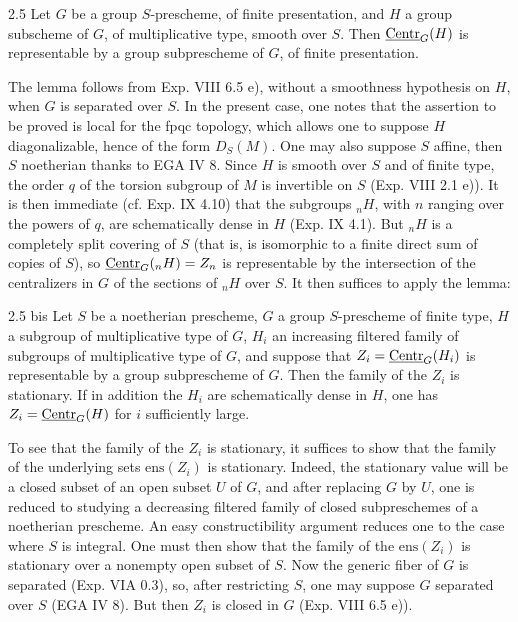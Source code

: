 \begin{lemma}{2.5}\label{XV.2.5}
Let $G$ be a group $S$-prescheme, of finite presentation, and $H$ a group subscheme of $G$, of multiplicative type, smooth over $S$. Then $\underline{\mathrm{Centr}}_G(H)$ is representable by a group subprescheme of $G$, of finite presentation.
\end{lemma}
The lemma follows from Exp. VIII 6.5 e), without a smoothness hypothesis on $H$, when $G$ is separated over $S$. In the present case, one notes that the assertion to be proved is local for the fpqc topology, which allows one to suppose $H$ diagonalizable, hence of the form $D_S(M)$. One may also suppose $S$ affine, then $S$ noetherian thanks to EGA IV 8. Since $H$ is smooth over $S$ and of finite type, the order $q$ of the torsion subgroup of $M$ is invertible on $S$ (Exp. VIII 2.1 e)). It is then immediate (cf. Exp. IX 4.10) that the subgroups ${}_nH$, with $n$ ranging over the powers of $q$, are schematically dense in $H$ (Exp. IX 4.1). But ${}_nH$ is a completely split covering of $S$ (that is, is isomorphic to a finite direct sum of copies of $S$), so $\underline{\mathrm{Centr}}_G({}_nH)=Z_n$ is representable by the intersection of the centralizers in $G$ of the sections of ${}_nH$ over $S$. It then suffices to apply the lemma:

\begin{lemma}{2.5 bis}\label{XV.2.5bis}
Let $S$ be a noetherian prescheme, $G$ a group $S$-prescheme of finite type, $H$ a subgroup of multiplicative type of $G$, $H_i$ an increasing filtered family of subgroups of multiplicative type of $G$, and suppose that $Z_i=\underline{\mathrm{Centr}}_G(H_i)$ is representable by a group subprescheme of $G$. Then the family of the $Z_i$ is stationary. If in addition the $H_i$ are schematically dense in $H$, one has $Z_i=\underline{\mathrm{Centr}}_G(H)$ for $i$ sufficiently large.
\end{lemma}
To see that the family of the $Z_i$ is stationary, it suffices to show that the family of the underlying sets $\mathrm{ens}(Z_i)$ is stationary. Indeed, the stationary value will be a closed subset of an open subset $U$ of $G$, and after replacing $G$ by $U$, one is reduced to studying a decreasing filtered family of closed subpreschemes of a noetherian prescheme. An easy constructibility argument reduces one to the case where $S$ is integral. One must then show that the family of the $\mathrm{ens}(Z_i)$ is stationary over a nonempty open subset of $S$. Now the generic fiber of $G$ is separated (Exp. VIA 0.3), so, after restricting $S$, one may suppose $G$ separated over $S$ (EGA IV 8). But then $Z_i$ is closed in $G$ (Exp. VIII 6.5 e)).
